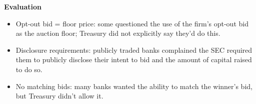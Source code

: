 \documentclass[8pt]{beamer}
\begin{document}
{\begin{columns}[T]
\begin{column}{.49\textwidth}
\textbf{Evaluation}
\vspace{2mm}
\begin{itemize}[label={--}]
\item Opt-out bid = floor price:  some questioned the use of the firm's opt-out bid as the auction floor; Treasury did not explicitly say they'd do this. 
\item Disclosure requirements: publicly traded banks complained the SEC required them to publicly disclose their intent to bid and the amount of capital raised to do so.
\item No matching bids: many banks wanted the ability to match the winner's bid, but Treasury didn't allow it.
\end{itemize}
\end{column}%
\end{columns}
}
\end{document}

